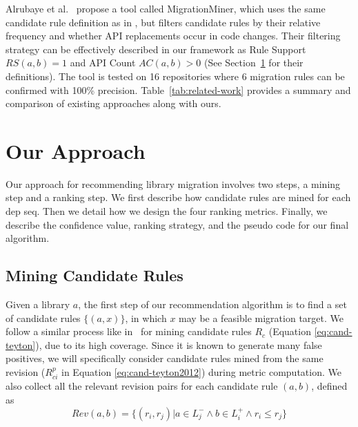 \documentclass[conference, 10pt]{IEEEtran}
\begin{document}
Alrubaye et al.~\cite{2019ICSME-Alrubaye-MigrationMiner} propose a tool called MigrationMiner, which uses the same candidate rule definition as in \cite{2012WCRE-Teyton-Mining}, but filters candidate rules by their relative frequency and whether API replacements occur in code changes. 
Their filtering strategy can be effectively described in our framework as Rule Support $RS(a,b)=1$ and API Count $AC(a,b)>0$ (See Section~\ref{sec:approach} for their definitions). 
The tool is tested on 16 repositories where 6 migration rules can be confirmed with 100\% precision. 
Table~\ref{tab:related-work} provides a summary and comparison of existing approaches along with ours.

\section{Our Approach}
\label{sec:approach}

Our approach for recommending library migration involves two steps, a mining step and a ranking step.
We first describe how candidate rules are mined for each dep seq. 
Then we detail how we design the four ranking metrics.
Finally, we describe the confidence value, ranking strategy, and the pseudo code for our final algorithm.

\subsection{Mining Candidate Rules} 

Given a library $a$, the first step of our recommendation algorithm is to find a set of candidate rules $\{(a, x)\}$, in which $x$ may be a feasible migration target. 
We follow a similar process like in~\cite{2014JournalOfSysAndSoft-Teyton-Study} for mining candidate rules $R_c$ (Equation \ref{eq:cand-teyton}), due to its high coverage.
Since it is known to generate many false positives, we will specifically consider candidate rules mined from the same revision ($R_{ci}^p$ in Equation \ref{eq:cand-teyton2012}) during metric computation. We also collect all the relevant revision pairs for each candidate rule $(a,b)$, defined as
\begin{equation}
    Rev(a,b)=\{(r_i,r_j)|a\in L_j^- \land b\in L_i^+ \land r_i\le r_j\}
\end{equation}
\end{document}
